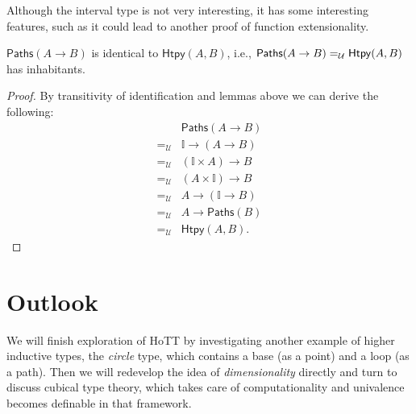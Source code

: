 \documentclass{article}
\newcommand{\calU}{\mathcal{U}}
\newcommand{\bbI}{\mathbb{I}}
\begin{document}
Although the interval type is not very interesting, it has some interesting 
features, such as it could lead to another proof of function extensionality.

\begin{lemma}
	$\mathsf{Paths}(A \to B)$ is identical to $\mathsf{Htpy}(A,B)$, i.e., $ 
	\Ideq{\calU}{\mathsf{Paths}(A \to B)}{\mathsf{Htpy}(A,B)}$ has 
	inhabitants.
\end{lemma}
\begin{proof}
	By transitivity of identification and lemmas above we can derive the 
	following:
	\[
	\begin{array}{cl}
	& \mathsf{Paths}(A \to B) \\
	=_{\calU} & \bbI \to (A \to B) \\
	=_{\calU} & (\bbI \times A) \to B \\
	=_{\calU} & (A \times \bbI) \to B \\
	=_{\calU} & A \to (\bbI \to B) \\
	=_{\calU} & A \to \mathsf{Paths}(B) \\
	=_{\calU} & \mathsf{Htpy}(A,B).
	\end{array}
	\]
\end{proof}

\section{Outlook}

We will finish exploration of HoTT by investigating another example of higher 
inductive types, the \emph{circle} type, which contains a base (as a 
point) and a loop (as a path).
Then we will redevelop the idea of \emph{dimensionality} directly and turn to 
discuss cubical type theory, which takes care of computationality and 
univalence becomes definable in that framework.



\end{document}
